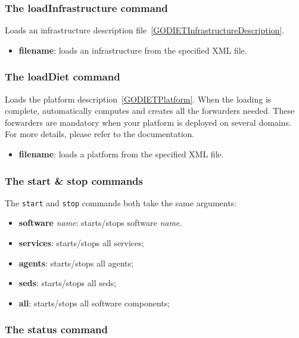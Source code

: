 \subsubsection{The loadInfrastructure command}
Loads an infrastructure description file~\ref{GODIETInfrastructureDescription}.

\begin{itemize}
  \item \textbf{filename}: loads an infrastructure from the specified XML file.
\end{itemize}

\subsubsection{The loadDiet command}
Loads the \diet platform description~\ref{GODIETPlatform}. When the loading is complete, \godiet automatically computes and creates all the \diet forwarders needed. These \diet forwarders are mandatory when your platform is deployed on several domains. For more details, please refer to the \diet documentation.

\begin{itemize}
  \item \textbf{filename}: loads a \diet platform from the specified XML file.
\end{itemize}

\subsubsection{The start \& stop commands}
\label{GODIETCommandStartStop}

The \verb+start+ and \verb+stop+ commands both take the same arguments:
\begin{itemize}
 \item \textbf{software} \emph{name}: starts/stops software \emph{name}.
 \item \textbf{services}: starts/stops all services;
 \item \textbf{agents}: starts/stops all agents;
 \item \textbf{seds}: starts/stops all seds;
 \item \textbf{all}: starts/stops all software components;
\end{itemize}

\subsubsection{The status command}

